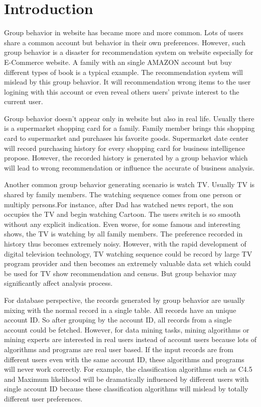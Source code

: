\section{Introduction}
Group behavior in website has became more and more common.
Lots of users share a common account but behavior in their own preferences.
However, such group behavior is a disaster for recommendation system on website especially
for E-Commerce website. A family with an single AMAZON account but buy different types of book
is a typical example. The recommendation system will mislead by this group behavior.
It will recommendation wrong items to the user logining with this account or even reveal others users' private
interest to the current user.

Group behavior doesn't appear only in website but also in real life. Usually there is a supermarket shopping card
for a family. Family member brings this shopping card to supermarket and purchases his favorite goods.
Supermarket date center will record purchasing history for every shopping card for business intelligence propose.
However, the recorded history is generated by a group behavior which will lead to wrong recommendation
or influence the accurate of business analysis.

Another common group behavior generating scenario is watch TV. Usually TV is shared by family members.
The watching sequence comes from one person or multiply persons.For instance, after Dad has watched
news report, the son occupies the TV and begin watching Cartoon. The users switch is so smooth without
any explicit indication. Even worse, for some famous and interesting shows, the TV is watching by all
family members. The preference recorded in history thus becomes extremely noisy.
However, with the rapid development of digital television technology, TV watching sequence could be record by
large TV program provider and then becomes an extremely valuable data set which could be used for TV show
recommendation and census. But group behavior may significantly affect analysis process.

For database perspective, the records generated by group behavior are usually mixing with the normal record
in a single table. All records have an unique account ID. So after grouping by the account ID, all records
from a single account could be fetched. However, for data mining tasks, mining algorithms or mining experts
are interested in real users instead of account users because lots of algorithms and programs are real user based.
If the input records are from different users even with the same account ID, these algorithms and programs will
never work correctly. For example, the classification algorithms such as C4.5 and Maximum likelihood
will be dramatically influenced by different users with single account ID because these classification algorithms
will mislead by totally different user preferences.

